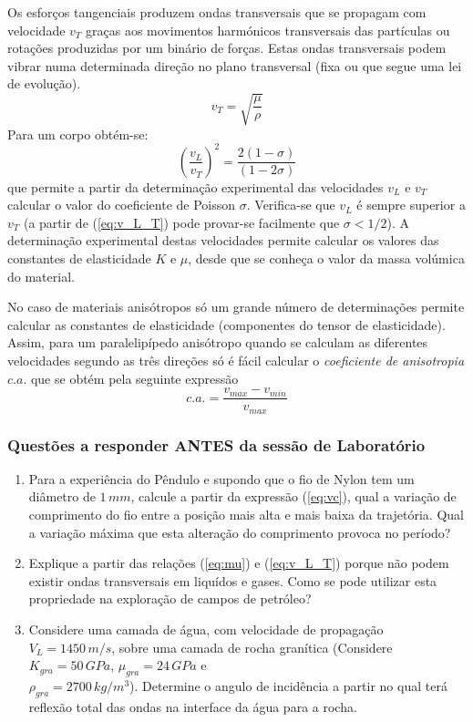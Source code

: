 \documentclass[a4paper,12pt]{article}
\begin{document}
Os esforços tangenciais produzem ondas transversais que se propagam com velocidade $v_T$ graças aos movimentos harmónicos transversais das partículas ou rotações produzidas por um binário de forças. Estas ondas transversais podem vibrar numa determinada direção no plano transversal (fixa ou que segue uma lei de evolução).
\begin{equation}
	\label{eq:vT}
	 v_T = \sqrt{\frac{\mu}{\rho}}
\end{equation}
Para um corpo obtém-se:
\begin{equation}
	\label{eq:v_L_T}
	\left(\frac{v_L}{v_T}\right)^2 =  \frac{2(1-\sigma)}{(1-2\sigma)} 
\end{equation}
que permite a partir da determinação experimental das velocidades $v_L$ e $v_T$ calcular o valor do coeficiente de Poisson $\sigma$. Verifica-se que $v_L$ é sempre superior a $v_T$  (a partir de (\ref{eq:v_L_T}) pode provar-se facilmente que $\sigma<1/2$).
A determinação experimental destas velocidades permite calcular os valores das constantes de elasticidade $K$ e $\mu$, desde que se conheça o valor da massa volúmica do material.

No caso de materiais anisótropos só um grande número de determinações permite calcular as constantes de elasticidade (componentes do tensor de elasticidade). Assim, para um paralelipípedo anisótropo quando se calculam as diferentes velocidades segundo as três direções só é fácil calcular o \emph{coeficiente de anisotropia} $c.a.$ que se obtém pela seguinte expressão
\begin{equation}
	\label{eq:ca}
	c.a.= \frac{v_{max}-v_{min}}{v_{max}}
\end{equation}

\subsubsection{\sf Questões a responder ANTES da sessão de Laboratório}

\begin{enumerate}
\item Para a experiência do Pêndulo e supondo que o fio de Nylon tem um diâmetro de $1\,mm $, calcule a partir da expressão (\ref{eq:vc}), qual a variação de comprimento 
do fio entre a posição mais alta e mais baixa da trajetória. Qual a variação máxima que esta alteração do comprimento provoca no período?
\item Explique a partir das relações (\ref{eq:mu})  e  (\ref{eq:v_L_T})  porque não podem existir ondas transversais em liquídos e gases. Como se pode utilizar esta propriedade 
na exploração de campos de petróleo?
\item Considere uma camada de água, com velocidade de propagação $V_L=1450 \,m/s$, sobre uma camada de rocha granítica (Considere $K_{gra}=50\,GPa$, $\mu_{gra}=24\,GPa$ e \\
$\rho_{gra}=2700\,kg/m^3$). 
Determine o angulo de incidência a partir no qual terá reflexão total das ondas na interface da água para a rocha.
\end{enumerate}
\end{document}

